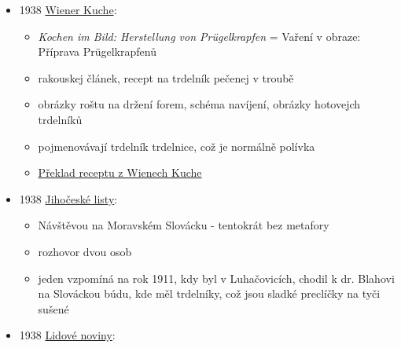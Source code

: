\begin{itemize}
  \begin{itemize}
  \tightlist
  \item
  \item
    knížka pro děti, fiktivní příběh o požáru Národního divadla
  \item
    vypráví, jak se tatínek po roce 1850 ženil ve Štěpánově u Olomouce a
    v hospodě měli nejlepší moravský lahůdky, mezi nimi i ohromný
    trdelník
  \item
    (ale jeho skutečnej otec se narodil 1847, takže kdo ví, jak moc je
    to založený na realitě)
  \end{itemize}
\item
  1938
  \href{https://web.archive.org/web/20201230125915/http://kurtos.eu/dl/11664.pdf}{Wiener
  Kuche}:

  \begin{itemize}
  \tightlist
  \item
    \emph{Kochen im Bild: Herstellung von Prügelkrapfen} = Vaření v
    obraze: Příprava Prügelkrapfenů
  \item
    rakouskej článek, recept na trdelník pečenej v troubě
  \item
    obrázky roštu na držení forem, schéma navíjení, obrázky hotovejch
    trdelníků
  \item
    pojmenovávají trdelník trdelnice, což je normálně polívka
  \item
    \hyperref[250615-0047]{Překlad receptu z Wienech Kuche}
  \end{itemize}
\item
  1938
  \href{https://ceskadigitalniknihovna.cz/uuid/uuid:e6636d2b-f486-4e2f-b5ae-fb4e89b772e4}{Jihočeské
  listy}:

  \begin{itemize}
  \tightlist
  \item
    Návštěvou na Moravském Slovácku - tentokrát bez metafory
  \item
    rozhovor dvou osob
  \item
    jeden vzpomíná na rok 1911, kdy byl v Luhačovicích, chodil k dr.
    Blahovi na Slováckou búdu, kde měl trdelníky, což jsou sladké
    preclíčky na tyči sušené
  \end{itemize}
\item
  1938
  \href{https://www.digitalniknihovna.cz/vkol/uuid/uuid:c2f2cb90-83f9-11dd-8fb3-000d606f5dc6}{Lidové
  noviny}:


\end{itemize}
